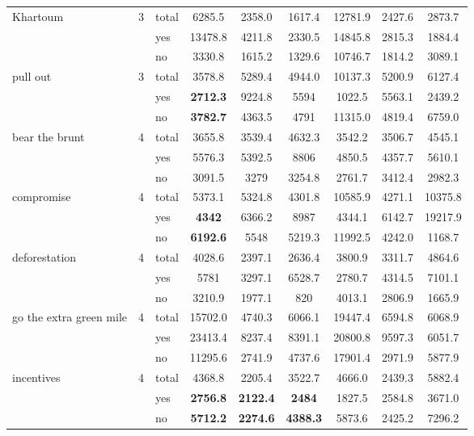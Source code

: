 {\begin{longtable}{@{ }p{2.2cm}@{ }l@{ }l@{}*{6}{S[table-format=5.1]}@{}}
\tablevspace
{  Khartoum} &  3 &  total &  6285.5 &  2358.0 &  1617.4 &  12781.9 &  2427.6 &  2873.7\\
&  &  yes &  13478.8 &  4211.8 &  2330.5 &  14845.8 &  2815.3 &  1884.4\\
 &  &  no &  3330.8 &  1615.2 &  1329.6 &  10746.7 &  1814.2 &  3089.1\\

\tablevspace
{  pull out} &  3 &  total &  3578.8 &  5289.4 &  4944.0 &  10137.3 &  5200.9 &  6127.4\\
&  &  yes & \bfseries 2712.3 &  9224.8 &  5594 &  1022.5 &  5563.1 &  2439.2\\
 &  &  no & \bfseries 3782.7 &  4363.5 &  4791 &  11315.0 &  4819.4 &  6759.0\\

\tablevspace
{  bear the brunt} &  4 &  total &  3655.8 &  3539.4 &  4632.3 &  3542.2 &  3506.7 &  4545.1\\
&  &  yes &  5576.3 &  5392.5 &  8806 &  4850.5 &  4357.7 &  5610.1\\
 &  &  no &  3091.5 &  3279 &  3254.8 &  2761.7 &  3412.4 &  2982.3\\
 
\tablevspace
 {  compromise} &  4 &  total &  5373.1 &  5324.8 &  4301.8 &  10585.9 &  4271.1 &  10375.8\\
&  &  yes & \bfseries 4342 &  6366.2 &  8987 &  4344.1 &  6142.7 &  19217.9\\
 &  &  no & \bfseries 6192.6 &  5548 &  5219.3 &  11992.5 &  4242.0 &  1168.7\\

\tablevspace
{  deforestation} &  4 &  total &  4028.6 &  2397.1 &  2636.4 &  3800.9 &  3311.7 &  4864.6\\
&  &  yes &  5781 &  3297.1 &  6528.7 &  2780.7 &  4314.5 &  7101.1\\
 &  &  no &  3210.9 &  1977.1 &  820 &  4013.1 &  2806.9 &  1665.9\\

\tablevspace
{\raggedright go the extra green mile} &  4 &  total &  15702.0 &  4740.3 &  6066.1 &  19447.4 &  6594.8 &  6068.9\\
&  &  yes &  23413.4 &  8237.4 &  8391.1 &  20800.8 &  9597.3 &  6051.7\\
 &  &  no &  11295.6 &  2741.9 &  4737.6 &  17901.4 &  2971.9 &  5877.9\\

\tablevspace
{  incentives} &  4 &  total &  4368.8 &  2205.4 &  3522.7 &  4666.0 &  2439.3 &  5882.4\\
&  &  yes & \bfseries 2756.8 & \bfseries 2122.4 & \bfseries 2484 &  1827.5 &  2584.8 &  3671.0\\
 &  &  no & \bfseries 5712.2 & \bfseries 2274.6 & \bfseries 4388.3 &  5873.6 &  2425.2 &  7296.2\\


\end{longtable}}
